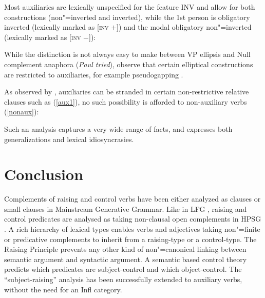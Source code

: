 \documentclass[output=paper
                ,modfonts
                ,nonflat
	        ,collection
	        ,collectionchapter
	        ,collectiontoclongg
 	        ,biblatex
                ,babelshorthands
                ,newtxmath
                ,draftmode
                ,colorlinks, citecolor=brown
]{./langsci/langscibook}
\begin{document}
Most auxiliaries are lexically unspecified for the feature INV and allow for both constructions (non"=inverted and inverted), while the 1st person  is obligatory inverted (lexically marked as [\textsc{inv} $+$]) and the modal  obligatory non"=inverted (lexically marked as [\textsc{inv} $-$]):

\eal
{}
\zl

While the distinction is not always easy to make between VP ellipsis and Null complement anaphora (\textit{Paul tried}), \citeauthor{Sagetal2020} observe that certain elliptical constructions are restricted to auxiliaries, for example pseudogapping \citep{Miller2014a}.

\eal
{}
\zl

As observed by \citet{ArnoldandBorsley2008}, auxiliaries can be stranded in certain non-restrictive relative clauses such as (\ref{aux1}), no such possibility is afforded to non-auxiliary verbs (\ref{nonaux}):

\eal
{}
\zl

Such an analysis captures a very wide range of facts, and expresses both generalizations and lexical idiosyncrasies.


	
\section{Conclusion}
Complements of raising and control verbs have been either analyzed as clauses \citep{Chomsky1981} or small clauses \citep{Stowell1981,Stowell1983} in Mainstream Generative Grammar.
Like in LFG \citep{Bresnan1982}, raising and control predicates are analysed as taking non-clausal open complements in HPSG \citep{PollardandSag1994}. A rich hierarchy of lexical types enables verbs and adjectives taking non"=finite or predicative complements to inherit from a raising-type or a control-type. The Raising Principle prevents any other kind of non"=canonical linking between semantic argument and syntactic argument. A semantic based control theory predicts which predicates are subject-control and which object-control. The ``subject-raising'' analysis has been successfully extended to auxiliary verbs, without the need for an Infl category.
\end{document}
